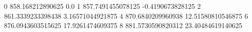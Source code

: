 0 858.168212890625 0.0
1 857.7491455078125 -0.4190673828125
2 861.3339233398438 3.16571044921875
4 870.6840209960938 12.51580810546875
6 876.0943603515625 17.9261474609375
8 881.5730590820312 23.40484619140625
